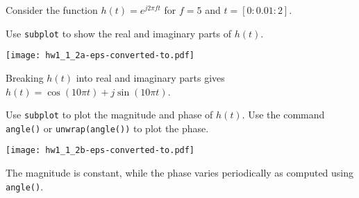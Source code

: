 \documentclass{ximera}
\author{Jont Allen}
\begin{document}
\begin{problem}
    Consider the function \(h(t) = e^{j2\pi ft}\) for \(f = 5\) and \(t = [0:0.01:2]\).
    
    Use \texttt{subplot} to show the real and imaginary parts of \(h(t)\).
    \begin{multipleChoice}
    \end{multipleChoice}
    \begin{feedback}[correct]
        \begin{center}
        \texttt{[image: hw1\_1\_2a-eps-converted-to.pdf]}
        \end{center}
    Breaking \(h(t)\) into real and imaginary parts gives \(h(t) = \cos(10\pi t) + j\sin(10\pi t)\).
    \end{feedback}
\end{problem}

\begin{problem}
    Use \texttt{subplot} to plot the magnitude and phase of \(h(t)\).
    Use the command \texttt{angle()} or \texttt{unwrap(angle())} to plot the phase.
    \begin{multipleChoice}
    \end{multipleChoice}
    \begin{feedback}[correct]
        \begin{center}
            \texttt{[image: hw1\_1\_2b-eps-converted-to.pdf]}
            \end{center}
    The magnitude is constant, while the phase varies periodically as computed using \texttt{angle()}.
    \end{feedback}
\end{problem}
\end{document}
